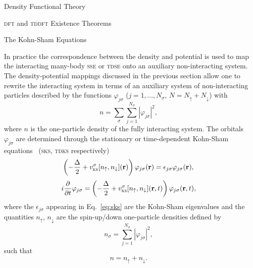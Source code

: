 \documentclass[letterpaper, 11 pt]{report}
\begin{document}
\begin{chapter}{Density Functional Theory \label{chap:dft}}
\begin{section}{\textsc{dft} and \textsc{tddft} Existence Theorems \label{sec:dft}}
   \end{section}

   \begin{section}{The Kohn-Sham Equations \label{sec:ks}}

      In practice the correspondence between the density and potential is used to map the interacting
      many-body \textsc{sse} or \textsc{tdse} onto an auxiliary non-interacting system. The
      density-potential mappings discussed in the previous section allow one to rewrite the interacting
      system in terms of an auxiliary system of non-interacting particles described by the functions
      $\varphi_{j\sigma}$ ($j = 1, \dots, N_\sigma$, $N = N_\uparrow + N_\downarrow$) with
      \begin{equation} \label{eq:dendef2}
         n = \sum\limits_{\sigma} \sum\limits_{j = 1}^{N_\sigma}
                           \left| \varphi_{j\sigma} \right|^2,
      \end{equation}
      where $n$ is the one-particle density of the fully interacting system. The orbitals
      $\varphi_{j\sigma}$ are determined through the stationary or time-dependent Kohn-Sham
      equations~\cite{ks-eq, spin-dep1, spin-dep3, tdks} (\textsc{sks}, \textsc{tdks} respectively)
      \begin{equation} \label{eq:sks}
         \left( -\frac{\Delta}{2} + v^\sigma_\mathrm{\textsc{ks}}[n_\uparrow,
         n_\downarrow](\mathbf{r}) \right)
          \varphi_{j\sigma}(\mathbf{r}) = \epsilon_{j \sigma} \varphi_{j \sigma}(\mathbf{r}),
      \end{equation}
      \begin{equation} \label{eq:tdks}
         i \frac{\partial}{\partial t} \varphi_{j\sigma} =
            \left( -\frac{\Delta}{2} +
            v^\sigma_\mathrm{\textsc{ks}}[n_\uparrow, n_\downarrow](\mathbf{r},t)
            \right) \varphi_{j\sigma}(\mathbf{r},t),
      \end{equation}
      where the $\epsilon_{j \sigma}$ appearing in Eq.~\eqref{eq:sks} are the Kohn-Sham eigenvalues and
      the quantities $n_\uparrow$, $n_\downarrow$ are the spin-up/down one-particle densities defined by
      \begin{equation} \label{eq:spinden}
         n_\sigma = \sum\limits_{j=1}^{N_\sigma} \left| \varphi_{j\sigma} \right|^2,
      \end{equation}
      such that
      \begin{equation} \label{eq:denconstraint}
         n = n_\uparrow + n_\downarrow.
      \end{equation}


\end{section}
\end{chapter}
\end{document}
